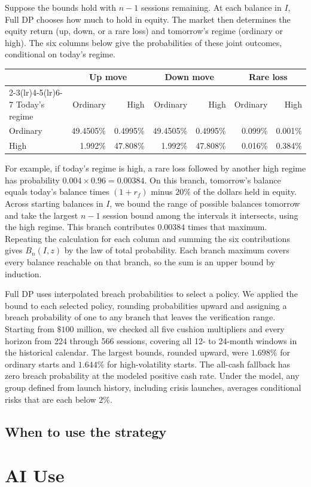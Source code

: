 \documentclass[10pt]{article}
\begin{document}
Suppose the bounds hold with $n-1$ sessions remaining. At each balance in $I$, Full DP chooses how much to hold in equity. The market then determines the equity return (up, down, or a rare loss) and tomorrow's regime (ordinary or high). The six columns below give the probabilities of these joint outcomes, conditional on today's regime.
\begin{center}
\small
\begin{tabular}{lrrrrrr}
\toprule
& \multicolumn{2}{c}{Up move} & \multicolumn{2}{c}{Down move} & \multicolumn{2}{c}{Rare loss} \\
\cmidrule(lr){2-3}\cmidrule(lr){4-5}\cmidrule(lr){6-7}
Today's regime & Ordinary & High & Ordinary & High & Ordinary & High \\
\midrule
Ordinary & 49.4505\% & 0.4995\% & 49.4505\% & 0.4995\% & 0.099\% & 0.001\% \\
High     & 1.992\% & 47.808\% & 1.992\% & 47.808\% & 0.016\% & 0.384\% \\
\bottomrule
\end{tabular}
\end{center}
For example, if today's regime is high, a rare loss followed by another high regime has probability $0.004\times0.96=0.00384$. On this branch, tomorrow's balance equals today's balance times $(1+r_f)$ minus $20\%$ of the dollars held in equity. Across starting balances in $I$, we bound the range of possible balances tomorrow and take the largest $n-1$ session bound among the intervals it intersects, using the high regime. This branch contributes $0.00384$ times that maximum. Repeating the calculation for each column and summing the six contributions gives $B_n(I,z)$ by the law of total probability. Each branch maximum covers every balance reachable on that branch, so the sum is an upper bound by induction.

Full DP uses interpolated breach probabilities to select a policy. We applied the bound to each selected policy, rounding probabilities upward and assigning a breach probability of one to any branch that leaves the verification range. Starting from $\$100$ million, we checked all five cushion multipliers and every horizon from 224 through 566 sessions, covering all 12- to 24-month windows in the historical calendar. The largest bounds, rounded upward, were $1.698\%$ for ordinary starts and $1.644\%$ for high-volatility starts. The all-cash fallback has zero breach probability at the modeled positive cash rate. Under the model, any group defined from launch history, including crisis launches, averages conditional risks that are each below $2\%$.

\subsection{When to use the strategy}

\appendix
\section{AI Use}
\end{document}
